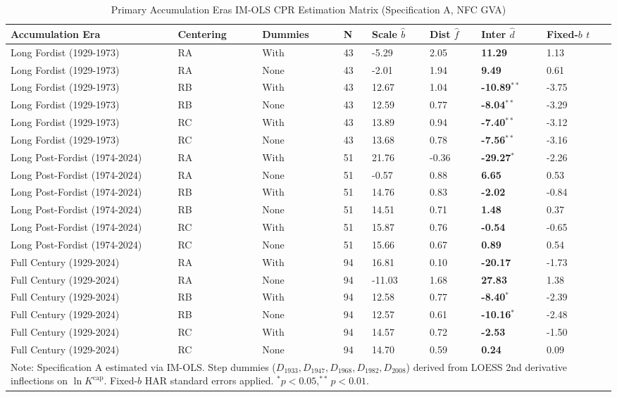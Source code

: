 \begin{table}[h!]
\centering
\small
\caption{Primary Accumulation Eras IM-OLS CPR Estimation Matrix (Specification A, NFC GVA)}
\label{tab:baseline_imols_primary}
\begin{tabular}{p{4.2cm} p{1.6cm} p{1.6cm} p{0.5cm} p{1.4cm} p{1.4cm} p{2.0cm} p{1.6cm}}
\toprule
\textbf{Accumulation Era} & \textbf{Centering} & \textbf{Dummies} & \textbf{N} & \textbf{Scale $\hat{b}$} & \textbf{Dist $\hat{f}$} & \textbf{Inter $\hat{d}$} & \textbf{Fixed-$b$ $t$} \\
\midrule
Long Fordist (1929-1973) & RA & With & 43 & -5.29 & 2.05 & \textbf{11.29} & 1.13 \\
Long Fordist (1929-1973) & RA & None & 43 & -2.01 & 1.94 & \textbf{9.49} & 0.61 \\
Long Fordist (1929-1973) & RB & With & 43 & 12.67 & 1.04 & \textbf{-10.89}$^{**}$ & -3.75 \\
Long Fordist (1929-1973) & RB & None & 43 & 12.59 & 0.77 & \textbf{-8.04}$^{**}$ & -3.29 \\
Long Fordist (1929-1973) & RC & With & 43 & 13.89 & 0.94 & \textbf{-7.40}$^{**}$ & -3.12 \\
Long Fordist (1929-1973) & RC & None & 43 & 13.68 & 0.78 & \textbf{-7.56}$^{**}$ & -3.16 \\
Long Post-Fordist (1974-2024) & RA & With & 51 & 21.76 & -0.36 & \textbf{-29.27}$^{*}$ & -2.26 \\
Long Post-Fordist (1974-2024) & RA & None & 51 & -0.57 & 0.88 & \textbf{6.65} & 0.53 \\
Long Post-Fordist (1974-2024) & RB & With & 51 & 14.76 & 0.83 & \textbf{-2.02} & -0.84 \\
Long Post-Fordist (1974-2024) & RB & None & 51 & 14.51 & 0.71 & \textbf{1.48} & 0.37 \\
Long Post-Fordist (1974-2024) & RC & With & 51 & 15.87 & 0.76 & \textbf{-0.54} & -0.65 \\
Long Post-Fordist (1974-2024) & RC & None & 51 & 15.66 & 0.67 & \textbf{0.89} & 0.54 \\
Full Century (1929-2024) & RA & With & 94 & 16.81 & 0.10 & \textbf{-20.17} & -1.73 \\
Full Century (1929-2024) & RA & None & 94 & -11.03 & 1.68 & \textbf{27.83} & 1.38 \\
Full Century (1929-2024) & RB & With & 94 & 12.58 & 0.77 & \textbf{-8.40}$^{*}$ & -2.39 \\
Full Century (1929-2024) & RB & None & 94 & 12.57 & 0.61 & \textbf{-10.16}$^{*}$ & -2.48 \\
Full Century (1929-2024) & RC & With & 94 & 14.57 & 0.72 & \textbf{-2.53} & -1.50 \\
Full Century (1929-2024) & RC & None & 94 & 14.70 & 0.59 & \textbf{0.24} & 0.09 \\
\bottomrule
\multicolumn{8}{p{15.5cm}}{\footnotesize Note: Specification A estimated via IM-OLS. Step dummies ($D_{1933}, D_{1947}, D_{1968}, D_{1982}, D_{2008}$) derived from LOESS 2nd derivative inflections on $\ln K^{\text{cap}}$. Fixed-$b$ HAR standard errors applied. $^*p<0.05, ^{**}p<0.01$.}
\end{tabular}
\end{table}
